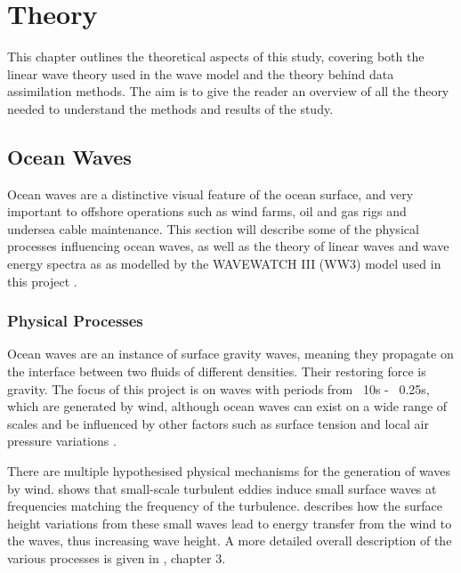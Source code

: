 
\chapter{Theory} %

\label{chap:theory} %

This chapter outlines the theoretical aspects of this study, covering both the linear wave theory used in the wave model and the theory behind data assimilation methods. The aim is to give the reader an overview of all the theory needed to understand the methods and results of the study.

\section{Ocean Waves}

Ocean waves are a distinctive visual feature of the ocean surface, and very important to offshore operations such as wind farms, oil and gas rigs and undersea cable maintenance. This section will describe some of the physical processes influencing ocean waves, as well as the theory of linear waves and wave energy spectra as as modelled by the WAVEWATCH III (WW3) model used in this project \citep{WW3DG2019}.

\subsection{Physical Processes}

Ocean waves are an instance of surface gravity waves, meaning they propagate on the interface between two fluids of different densities. Their restoring force is gravity. The focus of this project is on waves with periods from ~10s - ~0.25s, which are generated by wind, although ocean waves can exist on a wide range of scales and be influenced by other factors such as surface tension and local air pressure variations
\citep[pp. 3-7]{Holthuijsen2007}. 

There are multiple hypothesised physical mechanisms for the generation of waves by wind. \citet{Phillips1957} shows that small-scale turbulent eddies induce small surface waves at frequencies matching the frequency of the turbulence. \citet{Miles1957} describes how the surface height variations from these small waves lead to energy transfer from the wind to the waves, thus increasing wave height. A more detailed overall description of the various processes is given in \citet{Janssen2004}, chapter 3.

